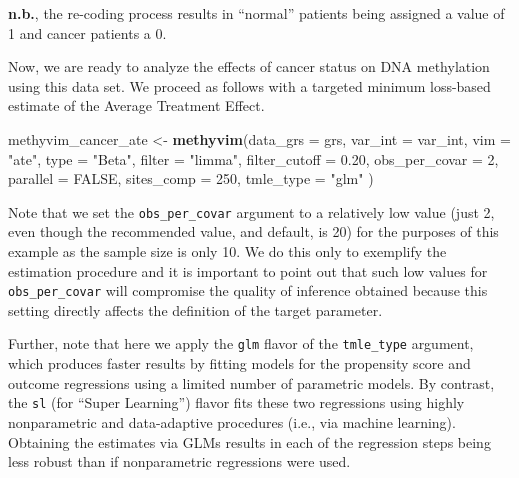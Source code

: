 \documentclass[9pt,a4paper,]{extarticle}
\newenvironment{Shaded}{\begin{snugshade}}{\end{snugshade}}
\newcommand{\DataTypeTok}[1]{\textcolor[rgb]{0.13,0.29,0.53}{#1}}
\newcommand{\DecValTok}[1]{\textcolor[rgb]{0.00,0.00,0.81}{#1}}
\newcommand{\FloatTok}[1]{\textcolor[rgb]{0.00,0.00,0.81}{#1}}
\newcommand{\KeywordTok}[1]{\textcolor[rgb]{0.13,0.29,0.53}{\textbf{#1}}}
\newcommand{\NormalTok}[1]{#1}
\newcommand{\OperatorTok}[1]{\textcolor[rgb]{0.81,0.36,0.00}{\textbf{#1}}}
\newcommand{\OtherTok}[1]{\textcolor[rgb]{0.56,0.35,0.01}{#1}}
\newcommand{\StringTok}[1]{\textcolor[rgb]{0.31,0.60,0.02}{#1}}
\theoremstyle{definition}
\theoremstyle{definition}
\theoremstyle{definition}
\theoremstyle{remark}
\begin{document}
\begin{Shaded}
\end{Shaded}

\textbf{n.b.}, the re-coding process results in ``normal'' patients being assigned a
value of 1 and cancer patients a 0.

Now, we are ready to analyze the effects of cancer status on DNA methylation
using this data set. We proceed as follows with a targeted minimum loss-based
estimate of the Average Treatment Effect.

\begin{Shaded}
\begin{Highlighting}[]
\NormalTok{methyvim_cancer_ate <-}\StringTok{ }\KeywordTok{methyvim}\NormalTok{(}\DataTypeTok{data_grs =}\NormalTok{ grs, }\DataTypeTok{var_int =}\NormalTok{ var_int,}
                                \DataTypeTok{vim =} \StringTok{"ate"}\NormalTok{, }\DataTypeTok{type =} \StringTok{"Beta"}\NormalTok{, }\DataTypeTok{filter =} \StringTok{"limma"}\NormalTok{,}
                                \DataTypeTok{filter_cutoff =} \FloatTok{0.20}\NormalTok{, }\DataTypeTok{obs_per_covar =} \DecValTok{2}\NormalTok{,}
                                \DataTypeTok{parallel =} \OtherTok{FALSE}\NormalTok{, }\DataTypeTok{sites_comp =} \DecValTok{250}\NormalTok{,}
                                \DataTypeTok{tmle_type =} \StringTok{"glm"}
\NormalTok{                               )}
\end{Highlighting}
\end{Shaded}

Note that we set the \texttt{obs\_per\_covar} argument to a relatively low value (just 2,
even though the recommended value, and default, is 20) for the purposes of this
example as the sample size is only 10. We do this only to exemplify the
estimation procedure and it is important to point out that such low values for
\texttt{obs\_per\_covar} will compromise the quality of inference obtained because this
setting directly affects the definition of the target parameter.

Further, note that here we apply the \texttt{glm} flavor of the \texttt{tmle\_type} argument,
which produces faster results by fitting models for the propensity score and
outcome regressions using a limited number of parametric models. By contrast,
the \texttt{sl} (for ``Super Learning'') flavor fits these two regressions using highly
nonparametric and data-adaptive procedures (i.e., via machine learning).
Obtaining the estimates via GLMs results in each of the regression steps
being less robust than if nonparametric regressions were used.
\end{document}
